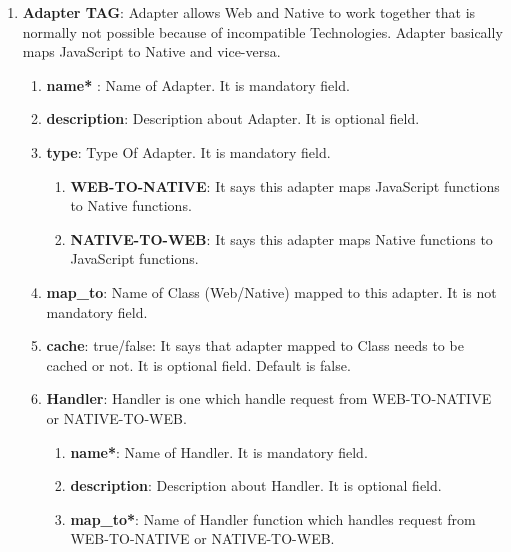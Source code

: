 \begin{enumerate}
	
	\item \small \textbf{Adapter TAG}: Adapter allows Web and Native to work together that is normally not possible because of incompatible Technologies. Adapter basically maps JavaScript to Native and vice-versa.
	
		\begin{enumerate}

			\item \small \textbf{name*} : Name of Adapter. It is mandatory field.
			\item \small \textbf{description}: Description about Adapter. It is optional field.
			\item \small \textbf{type}: Type Of Adapter. It is mandatory field.

				\begin{enumerate}

					\item \small \textbf{WEB-TO-NATIVE}: It says this adapter maps JavaScript functions to Native functions.
		
					\item \small \textbf{NATIVE-TO-WEB}: It says this adapter maps Native functions to JavaScript functions.
					
				\end{enumerate}


			\item \small \textbf{map\_to}: Name of Class (Web/Native) mapped to this adapter. It is not mandatory field.

			\item \small \textbf{cache}: true/false: It says that adapter mapped to Class needs to be cached or not. It is optional field. Default is false.


				\item \small \textbf{Handler}: Handler is one which handle request from WEB-TO-NATIVE or NATIVE-TO-WEB.

				\begin{enumerate}

					\item \small \textbf{name*}: Name of Handler. It is mandatory field.
					\item \small \textbf{description}: Description about Handler. It is optional field.
					\item\small \textbf{map\_to*}: Name of Handler function which handles request from WEB-TO-NATIVE or NATIVE-TO-WEB.


\end{enumerate}
\end{enumerate}
\end{enumerate}
